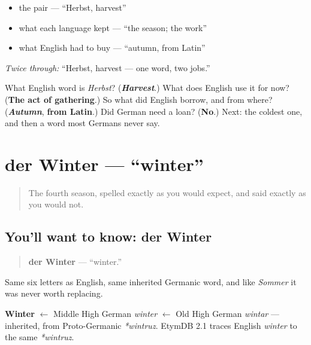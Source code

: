\begin{itemize}
\raggedright
  \item the pair — \textquotedblleft{}Herbst, harvest\textquotedblright{}
  \item what each language kept — \textquotedblleft{}the season; the work\textquotedblright{}
  \item what English had to buy — \textquotedblleft{}autumn, from Latin\textquotedblright{}
\end{itemize}

\emph{Twice through:} \textquotedblleft{}Herbst, harvest — one word, two jobs.\textquotedblright{}

\begin{tcolorbox}[breakable,colback=teal!4,colframe=teal!35!black,title={Before you move on}]
What English word is \emph{Herbst}? (\emph{\textbf{Harvest}}.) What does English use it for now? (\textbf{The act of gathering}.) So what did English borrow, and from where? (\emph{\textbf{Autumn}}, \textbf{from Latin}.) Did German need a loan? (\textbf{No}.) Next: the coldest one, and then a word most Germans never say.
\end{tcolorbox}
\section[der Winter]{der Winter — \textquotedblleft{}winter\textquotedblright{}}

\label{lesson:GE-C09-winter}



\begin{quote}
The fourth season, spelled exactly as you would expect, and said exactly as you would not.
\end{quote}

\subsection*{You'll want to know: der Winter}
\begin{quote}
\textbf{der Winter} — \textquotedblleft{}winter.\textquotedblright{}
\end{quote}

Same six letters as English, same inherited Germanic word, and like \emph{Sommer} it was never worth replacing.

\begin{cousinweb}
\textbf{Winter} $\leftarrow$ Middle High German \emph{winter} $\leftarrow$ Old High German \emph{wintar} — inherited, from Proto-Germanic \emph{*wintruz}. EtymDB 2.1 traces English \emph{winter} to the same \emph{*wintruz}.
\end{cousinweb}

